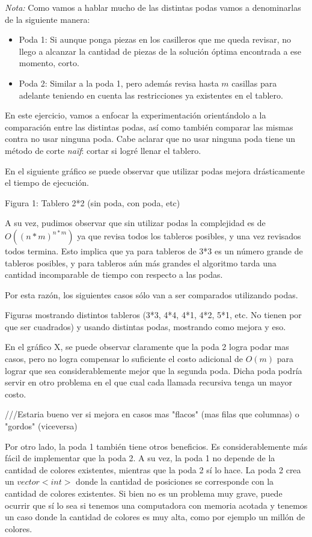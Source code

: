 \emph{Nota:} Como vamos a hablar mucho de las distintas podas vamos a denominarlas de la siguiente manera:
\begin{itemize}
\item Poda 1: Si aunque ponga piezas en los casilleros que me queda revisar, no llego a alcanzar la cantidad de piezas de la solución óptima encontrada a ese momento, corto.
\item Poda 2: Similar a la poda 1, pero además revisa hasta $m$ casillas para adelante teniendo en cuenta las restricciones ya existentes en el tablero.
\end{itemize}

En este ejercicio, vamos a enfocar la experimentación orientándolo a la comparación entre las distintas podas, así como también comparar las mismas contra no usar ninguna poda. Cabe aclarar que no usar ninguna poda tiene un método de corte \emph{naïf}: cortar si logré llenar el tablero.

En el siguiente gráfico se puede observar que utilizar podas mejora drásticamente el tiempo de ejecución.

Figura 1: Tablero 2*2 (sin poda, con poda, etc)

A su vez, pudimos observar que sin utilizar podas la complejidad es de $O((n*m)^{n*m})$ ya que revisa todos los tableros posibles, y una vez revisados todos termina. Esto implica que ya para tableros de 3*3 es un número grande de tableros posibles, y para tableros aún más grandes el algoritmo tarda una cantidad incomparable de tiempo con respecto a las podas.

Por esta razón, los siguientes casos sólo van a ser comparados utilizando podas.

Figuras mostrando distintos tableros (3*3, 4*4, 4*1, 4*2, 5*1, etc. No tienen por que ser cuadrados) y usando distintas podas, mostrando como mejora y eso.

En el gráfico X, se puede observar claramente que la poda 2 logra podar mas casos, pero no logra compensar lo suficiente el costo adicional de $O(m)$ para lograr que sea considerablemente mejor que la segunda poda. Dicha poda podría servir en otro problema en el que cual cada llamada recursiva tenga un mayor costo.

///Estaria bueno ver si mejora en casos mas "flacos" (mas filas que columnas) o "gordos" (viceversa)

Por otro lado, la poda 1 también tiene otros beneficios. Es considerablemente más fácil de implementar que la poda 2. A su vez, la poda 1 no depende de la cantidad de colores existentes, mientras que la poda 2 sí lo hace. La poda 2 crea un $vector<int>$ donde la cantidad de posiciones se corresponde con la cantidad de colores existentes. Si bien no es un problema muy grave, puede ocurrir que sí lo sea si tenemos una computadora con memoria acotada y tenemos un caso donde la cantidad de colores es muy alta, como por ejemplo un millón de colores.
